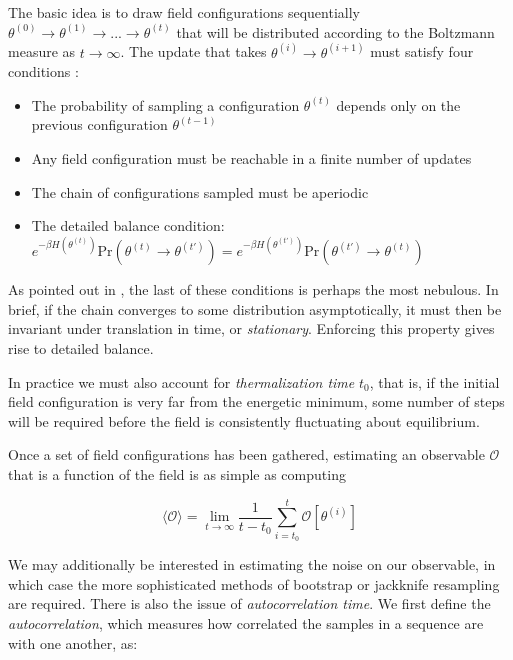 \documentclass[12pt]{article}
\begin{document}
The basic idea is to draw field configurations sequentially $\theta^{(0)} \rightarrow \theta^{(1)} \rightarrow ... \rightarrow \theta^{(t)}$ that will be
distributed according to the Boltzmann measure as $t\rightarrow\infty$. The update that takes $\theta^{(i)}\rightarrow\theta^{(i+1)}$ must satisfy four conditions \cite{hanada2018markovchainmontecarlo}:

\begin{itemize}
	\item The probability of sampling a configuration $\theta^{(t)}$ depends only on the previous configuration $\theta^{(t-1)}$
	\item Any field configuration must be reachable in a finite number of updates
	\item The chain of configurations sampled must be aperiodic
	\item The detailed balance condition: $e^{-\beta H(\theta^{(t)})}\text{Pr}(\theta^{(t)}\rightarrow\theta^{(t')})=e^{-\beta H(\theta^{(t')})}\text{Pr}(\theta^{(t')}\rightarrow\theta^{(t)})$
\end{itemize}

As pointed out in \cite{hanada2018markovchainmontecarlo}, the last of these conditions is perhaps the most nebulous. In brief, if the chain converges to some
distribution asymptotically, it must then be invariant under translation in time, or \textit{stationary}. Enforcing this property gives rise to detailed balance.

In practice we must also account for \textit{thermalization time} $t_0$, that is, if the initial field configuration is very far from the energetic minimum, some number of steps
will be required before the field is consistently fluctuating about equilibrium.

Once a set of field configurations has been gathered, estimating an observable $\mathcal{O}$ that is a function of the field is as simple as computing

\begin{equation}
	\langle \mathcal{O} \rangle = \lim_{t \to \infty} \frac{1}{t-t_0} \sum_{i=t_0}^{t} \mathcal{O}[\theta^{(i)}]
\end{equation}

We may additionally be interested in estimating the noise on our observable, in which case the more sophisticated methods of bootstrap or jackknife resampling
are required. There is also the issue of \textit{autocorrelation time}. We first define the \textit{autocorrelation}, which measures how correlated 
the samples in a sequence are with one another, as:
\end{document}
